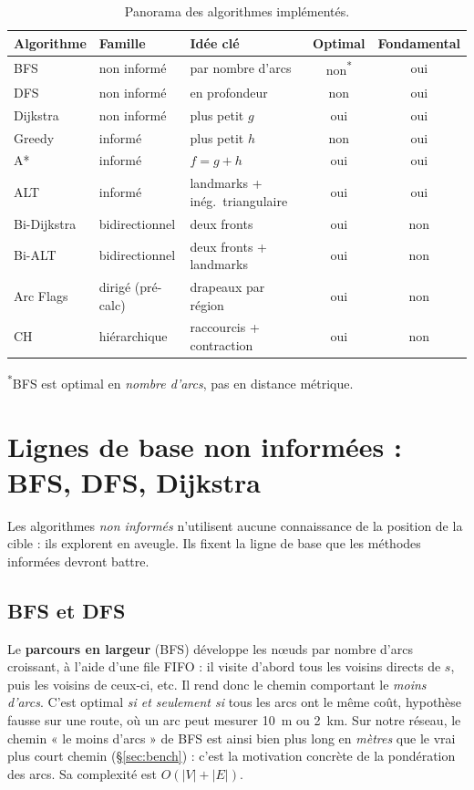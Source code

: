 \begin{table}[htbp]
  \centering
  \small
  \begin{tabular}{@{}lllc c@{}}
    \toprule
    Algorithme & Famille & Idée clé & Optimal & Fondamental \\
    \midrule
    BFS            & non informé      & par nombre d'arcs        & non\textsuperscript{*} & oui \\
    DFS            & non informé      & en profondeur            & non & oui \\
    Dijkstra       & non informé      & plus petit $g$           & oui & oui \\
    Greedy         & informé          & plus petit $h$           & non & oui \\
    A*             & informé          & $f = g + h$              & oui & oui \\
    ALT            & informé          & landmarks + inég.\ triangulaire & oui & oui \\
    Bi-Dijkstra    & bidirectionnel   & deux fronts              & oui & non \\
    Bi-ALT         & bidirectionnel   & deux fronts + landmarks  & oui & non \\
    Arc Flags      & dirigé (pré-calc) & drapeaux par région     & oui & non \\
    CH             & hiérarchique     & raccourcis + contraction & oui & non \\
    \bottomrule
  \end{tabular}

  \smallskip
  {\footnotesize \textsuperscript{*}BFS est optimal en \emph{nombre d'arcs}, pas
  en distance métrique.}
  \caption{Panorama des algorithmes implémentés.}
  \label{tab:algos-panorama}
\end{table}

\section{Lignes de base non informées : BFS, DFS, Dijkstra}
\label{sec:baselines}

Les algorithmes \emph{non informés} n'utilisent aucune connaissance de la
position de la cible : ils explorent en aveugle. Ils fixent la ligne de base que
les méthodes informées devront battre.

\subsection{BFS et DFS}
Le \textbf{parcours en largeur} (BFS) développe les nœuds par nombre d'arcs
croissant, à l'aide d'une file FIFO : il visite d'abord tous les voisins directs
de $s$, puis les voisins de ceux-ci, etc. Il rend donc le chemin comportant le
\emph{moins d'arcs}. C'est optimal \emph{si et seulement si} tous les arcs ont le
même coût, hypothèse fausse sur une route, où un arc peut mesurer 10~m ou
2~km. Sur notre réseau, le chemin « le moins d'arcs » de BFS est ainsi bien plus
long en \emph{mètres} que le vrai plus court chemin (\S\ref{sec:bench}) : c'est la
motivation concrète de la pondération des arcs. Sa complexité est $O(|V| + |E|)$.

